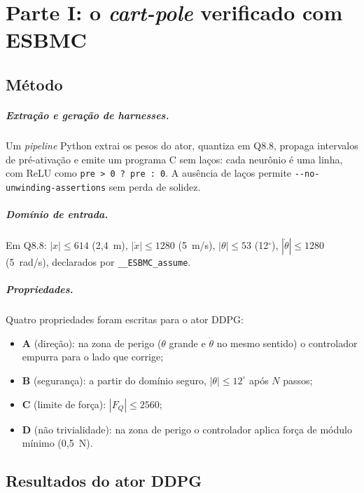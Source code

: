\documentclass[12pt,openright,oneside,a4paper,chapter=TITLE,sumario=tradicional,english,brazil]{abntex2}
\begin{document}
\chapter{Parte I: o \emph{cart-pole} verificado com ESBMC}\label{cap:esbmc}

\section{Método}

\paragraph{Extração e geração de \emph{harnesses}.} Um \emph{pipeline} Python extrai os pesos do ator, quantiza em Q8.8, propaga intervalos de pré-ativação e emite um programa C sem laços: cada neurônio é uma linha, com ReLU como \texttt{pre > 0 ? pre : 0}. A ausência de laços permite \texttt{-{}-no-unwinding-assertions} sem perda de solidez.

\paragraph{Domínio de entrada.} Em Q8.8: $|x|\le614$ (2,4~m), $|\dot x|\le1280$ (5~m/s), $|\theta|\le53$ (12$^\circ$), $|\dot\theta|\le1280$ (5~rad/s), declarados por \texttt{\_\_ESBMC\_assume}.

\paragraph{Propriedades.} Quatro propriedades foram escritas para o ator DDPG:
\begin{itemize}
  \item \textbf{A} (direção): na zona de perigo ($\theta$ grande e $\dot\theta$ no mesmo sentido) o controlador empurra para o lado que corrige;
  \item \textbf{B} (segurança): a partir do domínio seguro, $|\theta|\le12^\circ$ após $N$ passos;
  \item \textbf{C} (limite de força): $|F_Q|\le2560$;
  \item \textbf{D} (não trivialidade): na zona de perigo o controlador aplica força de módulo mínimo (0,5~N).
\end{itemize}

\section{Resultados do ator DDPG}
\end{document}
